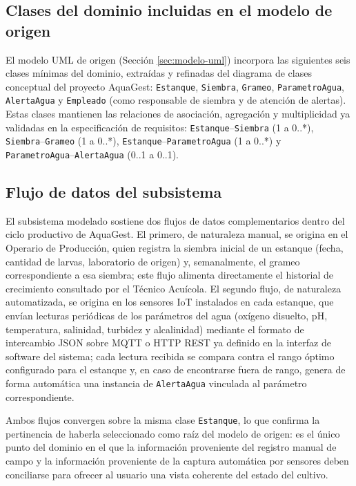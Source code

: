 \documentclass[11pt,a4paper]{article}
\begin{document}
\subsection{Clases del dominio incluidas en el modelo de origen}

El modelo UML de origen (Sección \ref{sec:modelo-uml}) incorpora las siguientes seis clases mínimas del dominio, extraídas y refinadas del diagrama de clases conceptual del proyecto AquaGest: \texttt{Estanque}, \texttt{Siembra}, \texttt{Grameo}, \texttt{ParametroAgua}, \texttt{AlertaAgua} y \texttt{Empleado} (como responsable de siembra y de atención de alertas). Estas clases mantienen las relaciones de asociación, agregación y multiplicidad ya validadas en la especificación de requisitos: \texttt{Estanque}--\texttt{Siembra} (1 a 0..*), \texttt{Siembra}--\texttt{Grameo} (1 a 0..*), \texttt{Estanque}--\texttt{ParametroAgua} (1 a 0..*) y \texttt{ParametroAgua}--\texttt{AlertaAgua} (0..1 a 0..1).

\subsection{Flujo de datos del subsistema}

El subsistema modelado sostiene dos flujos de datos complementarios dentro del ciclo productivo de AquaGest. El primero, de naturaleza manual, se origina en el Operario de Producción, quien registra la siembra inicial de un estanque (fecha, cantidad de larvas, laboratorio de origen) y, semanalmente, el grameo correspondiente a esa siembra; este flujo alimenta directamente el historial de crecimiento consultado por el Técnico Acuícola. El segundo flujo, de naturaleza automatizada, se origina en los sensores IoT instalados en cada estanque, que envían lecturas periódicas de los parámetros del agua (oxígeno disuelto, pH, temperatura, salinidad, turbidez y alcalinidad) mediante el formato de intercambio JSON sobre MQTT o HTTP REST ya definido en la interfaz de software del sistema; cada lectura recibida se compara contra el rango óptimo configurado para el estanque y, en caso de encontrarse fuera de rango, genera de forma automática una instancia de \texttt{AlertaAgua} vinculada al parámetro correspondiente.

Ambos flujos convergen sobre la misma clase \texttt{Estanque}, lo que confirma la pertinencia de haberla seleccionado como raíz del modelo de origen: es el único punto del dominio en el que la información proveniente del registro manual de campo y la información proveniente de la captura automática por sensores deben conciliarse para ofrecer al usuario una vista coherente del estado del cultivo.
\end{document}
